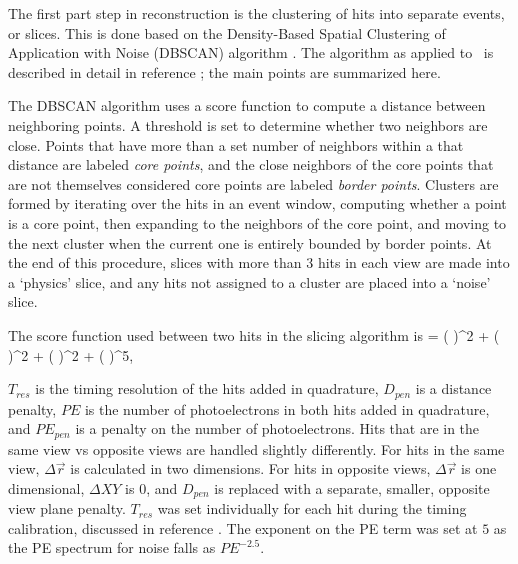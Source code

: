 The first part step in reconstruction is the clustering of hits into separate events, or slices. This is done based on the Density-Based Spatial Clustering of Application with Noise (DBSCAN) algorithm \cite{ref:RecoDBSCAN}. The algorithm as applied to \nova~is described in detail in reference \cite{ref:ThesisMichael}; the main points are summarized here.

The DBSCAN algorithm uses a score function to compute a distance between neighboring points. A threshold is set to determine whether two neighbors are close. Points that have more than a set number of neighbors within a that distance are labeled {\em core points}, and the close neighbors of the core points that are not themselves considered core points are labeled {\em border points}. Clusters are formed by iterating over the hits in an event window, computing whether a point is a core point, then expanding to the neighbors of the core point, and moving to the next cluster when the current one is entirely bounded by border points. At the end of this procedure, slices with more than $3$ hits in each view are made into a `physics' slice, and any hits not assigned to a cluster are placed into a `noise' slice.

The score function used between two hits in the slicing algorithm is
\beq
\epsilon = \left(  \right)^2 + \left(  \right)^2 + \left(  \right)^2 + \left(  \right)^5,
\label{eq:SlicerScore}
\eeq

\n $T_{res}$ is the timing resolution of the hits added in quadrature, $D_{pen}$ is a distance penalty, $PE$ is the number of photoelectrons in both hits added in quadrature, and $PE_{pen}$ is a penalty on the number of photoelectrons. Hits that are in the same view vs opposite views are handled slightly differently. For hits in the same view, $\Delta \vec{r}$ is calculated in two dimensions. For hits in opposite views, $\Delta \vec{r}$ is one dimensional, $\Delta XY$ is $0$, and $D_{pen}$ is replaced with a separate, smaller, opposite view plane penalty. $T_{res}$ was set individually for each hit during the timing calibration, discussed in reference \cite{ref:TNCalib}. The exponent on the PE term was set at $5$ as the PE spectrum for noise falls as $PE^{-2.5}$.

